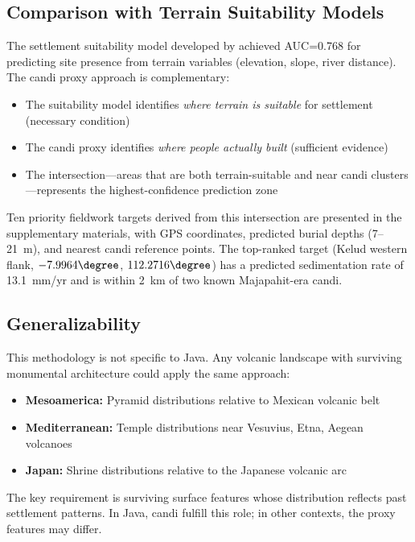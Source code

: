 \documentclass[12pt,a4paper]{article}
\begin{document}
\subsection{Comparison with Terrain Suitability Models}

The settlement suitability model developed by \citet{amien2026p2} achieved AUC=0.768 for predicting site presence from terrain variables (elevation, slope, river distance). The candi proxy approach is complementary:

\begin{itemize}
    \item The suitability model identifies \emph{where terrain is suitable} for settlement (necessary condition)
    \item The candi proxy identifies \emph{where people actually built} (sufficient evidence)
    \item The intersection---areas that are both terrain-suitable and near candi clusters---represents the highest-confidence prediction zone
\end{itemize}

Ten priority fieldwork targets derived from this intersection are presented in the supplementary materials, with GPS coordinates, predicted burial depths (7--21~m), and nearest candi reference points. The top-ranked target (Kelud western flank, $-7.9964\degree$, $112.2716\degree$) has a predicted sedimentation rate of 13.1~mm/yr and is within 2~km of two known Majapahit-era candi.

\subsection{Generalizability}

This methodology is not specific to Java. Any volcanic landscape with surviving monumental architecture could apply the same approach:
\begin{itemize}
    \item \textbf{Mesoamerica:} Pyramid distributions relative to Mexican volcanic belt
    \item \textbf{Mediterranean:} Temple distributions near Vesuvius, Etna, Aegean volcanoes
    \item \textbf{Japan:} Shrine distributions relative to the Japanese volcanic arc
\end{itemize}

The key requirement is surviving surface features whose distribution reflects past settlement patterns. In Java, candi fulfill this role; in other contexts, the proxy features may differ.
\end{document}
